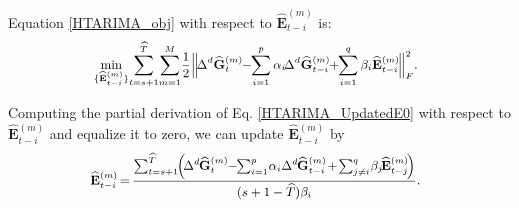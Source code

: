 \documentclass[letterpaper]{article} %
\numberwithin{theorem}{section}
\begin{document}
Equation  \eqref{HTARIMA_obj}   with respect to $\widehat{\mathbf{E}}^{(m)}_{{t-i}} $   is: 
\begin{equation} \label{HTARIMA_UpdatedE0} 
\small 
\begin{aligned}   
\hspace{-0.2cm}\mathop{\min}_{\{\widehat{\mathbf{E}}^{(m)}_{{t-i}}\} } \hspace{-0.05cm}  \sum_{t=s+1}^{\widehat{T}} \hspace{-0.05cm}  \sum_{m=1}^{M}    \hspace{-0.05cm}  \frac{1}{2}  \Big \| \hspace{-0.05cm} \Delta^d   {\widehat{\mathbf{G}}^{(m)}_{t}}  \hspace{-0.1cm} -  \hspace{-0.1cm}  \sum_{i=1}^{p} \alpha_i  \hspace{-0.05cm}  \Delta^d  {\widehat{\mathbf{G}}^{(m)}_{{t-i}}} \hspace{-0.1cm} +\hspace{-0.1cm}   \sum_{i=1}^{q} \beta_i {\widehat{\mathbf{E}}^{(m)}_{{t-i}}}  \hspace{-0.05cm}  \Big {\|} _F^2.  
\end{aligned}  
\end{equation}

Computing  the partial derivation of  Eq. \eqref{HTARIMA_UpdatedE0}  with respect to $\widehat{\mathbf{E}}{^{(m)}_{{t-i}}} $ and equalize it  to zero, 
we can update  $\widehat{\mathbf{E}}{^{(m)}_{{t-i}}} $ by  
\begin{equation} \label{HTARIMA_UpdatedEF}
\small 
\begin{aligned}  \hspace{-0.2cm}
\widehat{\mathbf{E}}{^{(m)}_{{t-i}}} \hspace{-0.04cm}  = \hspace{-0.04cm} \frac{\sum_{t=s+1}^{\widehat{T}}   \hspace{-0.1cm} 
	\Big( \hspace{-0.05cm} \Delta^d \hspace{-0.03cm} {\widehat{\mathbf{G}}^{(m)}_{t}}  \hspace{-0.1cm}  - \hspace{-0.1cm}   \sum_{i=1}^{p}\hspace{-0.05cm}  \alpha_i \Delta^d \hspace{-0.03cm}  {\widehat{\mathbf{G}}^{(m)}_{{t-i}}}   \hspace{-0.05cm} + \hspace{-0.05cm}  \sum_{j
		\neq i}^{q}  \hspace{-0.05cm}  \beta_j \hspace{-0.05cm}  \widehat{\mathbf{E}}{^{(m)}_{{t-j}}}\hspace{-0.05cm}  \Big)} 
{(s+1-\widehat{T}) \beta_i   }.
\end{aligned} 
\end{equation}
\end{document}
